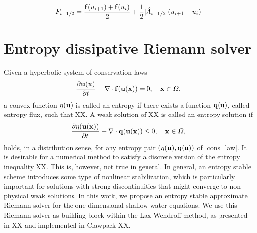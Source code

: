 \documentclass[preprint, 11pt]{article}
\newcommand{\A}{{\mathcal A}}
\newcommand{\bff}{{\bf f}}
\newcommand{\bfu}{{\bf u}}
\newcommand{\bfq}{{\bf q}}
\newcommand{\bfx}{{\bf x}}
\begin{document}
%

\begin{align*}
  F_{i+1/2}=\frac{\bff(u_{i+1})+\bff(u_i)}{2}+\frac{1}{2}|\hat A_{i+1/2}|(u_{i+1}-u_i)
\end{align*}


\clearpage
\section{Entropy dissipative Riemann solver}
Given a hyperbolic system of conservation laws 
\begin{align}\label{cons_law}
  \frac{\partial \bfu(\bfx)}{\partial t} + \nabla\cdot \bff(\bfu(\bfx))=0, \quad \bfx\in\Omega,
\end{align}
a convex function $\eta(\bfu)$ is called an entropy if there exists a function $\bfq(\bfu)$, called 
entropy flux, such that XX. A weak solution of XX is called an entropy solution if 
\begin{align}
  \frac{\partial \eta(\bfu(\bfx))}{\partial t} + \nabla\cdot \bfq(\bfu(\bfx))\leq 0, \quad \bfx\in\Omega,
\end{align}
holds, in a distribution sense, for any entropy pair $(\eta(\bfu),\bfq(\bfu))$ of \eqref{cons_law}.
It is desirable for a numerical method to satisfy a discrete version of the entropy inequality XX. 
This is, however, not true in general. 
In general, an entropy stable scheme introduces some type of nonlinear stabilization, which is 
particularly important for solutions with strong discontinuities that might converge to non-physical 
weak solutions. 
In this work, we propose an entropy stable approximate Riemann solver for the one dimensional 
shallow water equations. We use this Riemann solver as building block within the Lax-Wendroff 
method, as presented in XX and implemented in Clawpack XX.
\end{document}
